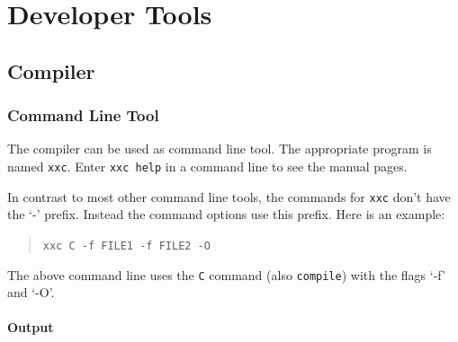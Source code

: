 \documentclass{report}
\def\xxc{\texttt{xxc}\xspace}
\begin{document}

\part{Developer Tools}



\chapter{Compiler}



\section{Command Line Tool}

The compiler can be used as command line tool. The appropriate program is named \xxc.
Enter \texttt{xxc help} in a command line to see the manual pages.

In contrast to most other command line tools, the commands for \xxc don't have the `-' prefix.
Instead the command options use this prefix. Here is an example:
\begin{quote}
\texttt{xxc C -f FILE1 -f FILE2 -O}
\end{quote}
The above command line uses the \texttt{C} command (also \texttt{compile}) with the flags `-f' and `-O'.

\subsection{Output}
\end{document}
